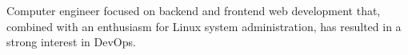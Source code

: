 Computer engineer focused on backend and frontend web development that, combined with an enthusiasm for Linux system administration, has resulted in a strong interest in DevOps.